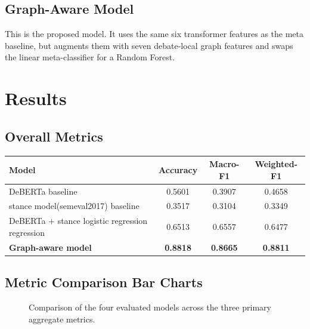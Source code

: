 \documentclass[11pt,a4paper]{article}
\begin{document}
\subsection{Graph-Aware Model}
This is the proposed model. It uses the same six transformer features as the meta baseline, but augments them with seven debate-local graph features and swaps the linear meta-classifier for a Random Forest.

\section{Results}
\subsection{Overall Metrics}
\begin{center}
\begin{tabular}{lccc}
\toprule
Model & Accuracy & Macro-F1 & Weighted-F1 \\
\midrule
 DeBERTa baseline & 0.5601 & 0.3907 & 0.4658 \\
 stance model(semeval2017) baseline & 0.3517 & 0.3104 & 0.3349 \\
DeBERTa + stance logistic regression regression & 0.6513 & 0.6557 & 0.6477 \\
\textbf{Graph-aware model} & \textbf{0.8818} & \textbf{0.8665} & \textbf{0.8811} \\
\bottomrule
\end{tabular}
\end{center}

\subsection{Metric Comparison Bar Charts}
\begin{figure}[htbp]
\centering
{}
\caption{Comparison of the four evaluated models across the three primary aggregate metrics.}
\end{figure}
\end{document}
